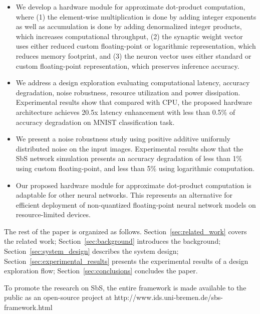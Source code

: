 \begin{itemize}
	\item We develop a hardware module for approximate dot-product computation, where (1) the element-wise multiplication is done by adding integer exponents as well as accumulation is done by adding denormalized integer products, which increases computational throughput, (2) the synaptic weight vector uses either reduced custom floating-point or logarithmic representation, which reduces memory footprint, and (3) the neuron vector uses either standard or custom floating-point representation, which preserves inference accuracy.
	\item We address a design exploration evaluating computational latency, accuracy degradation, noise robustness, resource utilization and power dissipation. Experimental results show that compared with CPU, the proposed hardware architecture achieves 20.5x latency enhancement with less than 0.5\% of accuracy degradation on MNIST classification task.
	\item We present a noise robustness study using positive additive uniformly distributed noise on the input images. Experimental results show that the SbS network simulation presents an accuracy degradation of less than 1\% using custom floating-point, and less than 5\% using logarithmic computation.
	\item Our proposed hardware module for approximate dot-product computation is adaptable for other neural networks. This represents an alternative for efficient deployment of non-quantized floating-point neural network models on resource-limited devices.
\end{itemize}


The rest of the paper is organized as follows. Section~\ref{sec:related_work} covers the related work; Section~\ref{sec:background} introduces the background; Section~\ref{sec:system_design} describes the system design; Section~\ref{sec:experimental_results} presents the experimental results of a design exploration flow; Section~\ref{sec:conclusions} concludes the paper.


To promote the research on SbS, the entire framework is made available to the public as an open-source project at http://www.ids.uni-bremen.de/sbs-framework.html

